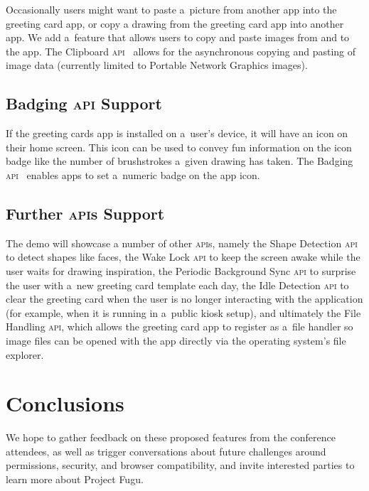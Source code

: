 \documentclass[sigconf, anonymous]{acmart}
\begin{document}
Occasionally users might want to paste a~picture from another app into the greeting card app,
or copy a drawing from the greeting card app into another app.
We add a~feature that allows users to copy and paste images from and to the app.
The Clipboard \textsc{api}~\cite{kacmarcik19} allows for the asynchronous copying and pasting
of image data (currently limited to Portable Network Graphics images).

\subsection{Badging \textsc{api} Support}

If the greeting cards app is installed on a~user's device,
it will have an icon on their home screen.
This icon can be used to convey fun information on the icon badge
like the number of brushstrokes a~given drawing has taken.
The Badging \textsc{api}~\cite{giuca19} enables apps to set a~numeric badge on the app icon.

\subsection{Further \textsc{api}s Support}

The demo will showcase a number of other \textsc{api}s, namely the
Shape Detection \textsc{api} to detect shapes like faces,
the Wake Lock  \textsc{api} to keep the screen awake
while the user waits for drawing inspiration, 
the Periodic Background Sync  \textsc{api} to surprise the user
with a~new greeting card template each day,
the Idle Detection \textsc{api} to clear the greeting card
when the user is no longer interacting with the application
(for example, when it is running in a~public kiosk setup),
and ultimately the File Handling \textsc{api}, which allows the greeting card app
to register as a~file handler so image files can be opened 
with the app directly via the operating system's file explorer.

\section{Conclusions}

We hope to gather feedback on these proposed features from the conference attendees,
as well as trigger conversations about future challenges around
permissions, security, and browser compatibility,
and invite interested parties to learn more about Project Fugu.



\end{document}
